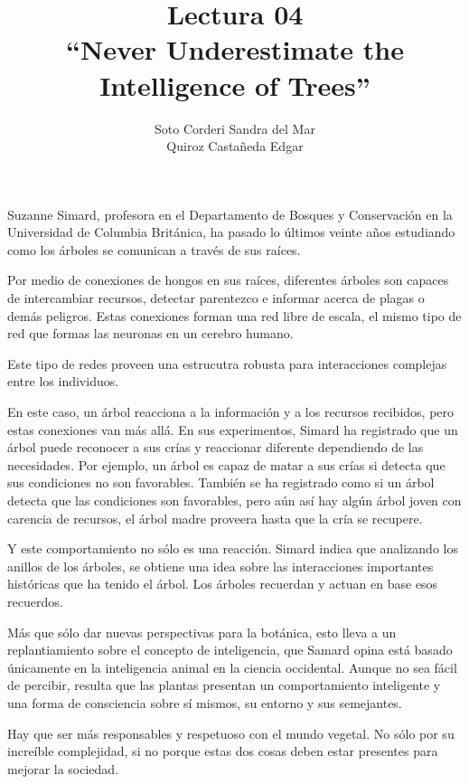 \documentclass[12pt, letterpaper]{article}
\title{
    Lectura 04\\ 
    ``Never Underestimate the Intelligence of Trees''
}
\author{
    Soto Corderi Sandra del Mar\\
    Quiroz Castañeda Edgar \\
}
\begin{document}
    \maketitle
    Suzanne Simard, profesora en el Departamento de Bosques y Conservación en la
    Universidad de Columbia Británica, ha pasado lo últimos veinte años 
    estudiando como los árboles se comunican a través de sus raíces.

    Por medio de conexiones de hongos en sus raíces, diferentes árboles son 
    capaces de intercambiar recursos, detectar parentezco e informar acerca de
    plagas o demás peligros. Estas conexiones forman una red libre de escala, el
    mismo tipo de red que formas las neuronas en un cerebro humano.

    Este tipo de redes proveen una estrucutra robusta para interacciones 
    complejas entre los individuos.

    En este caso, un árbol reacciona a la información y a los recursos 
    recibidos, pero estas conexiones van más allá.
    En sus experimentos, Simard ha registrado que un árbol puede reconocer a sus
    crías y reaccionar diferente dependiendo de las necesidades. 
    Por ejemplo, un árbol es capaz de matar a sus crías si detecta que sus 
    condiciones no son favorables. 
    También se ha registrado como si un árbol detecta que las condiciones son 
    favorables, pero aún así hay algún árbol joven con carencia de recursos, 
    el árbol madre proveera hasta que la cría se recupere.

    Y este comportamiento no sólo es una reacción. Simard indica que analizando
    los anillos de los árboles, se obtiene una idea sobre las interacciones
    importantes históricas que ha tenido el árbol. Los árboles recuerdan y 
    actuan en base esos recuerdos.

    Más que sólo dar nuevas perspectivas para la botánica, esto lleva a un 
    replantiamiento sobre el concepto de inteligencia, que Samard opina está 
    basado únicamente en la inteligencia animal en la ciencia occidental. 
    Aunque no sea fácil de percibir, resulta que las plantas presentan un 
    comportamiento inteligente y una forma de consciencia sobre sí mismos, su 
    entorno y sus semejantes.

    Hay que ser más responsables y respetuoso con el mundo vegetal. No sólo por 
    su increíble complejidad, si no porque estas dos cosas deben estar presentes
    para mejorar la sociedad.
\end{document}
